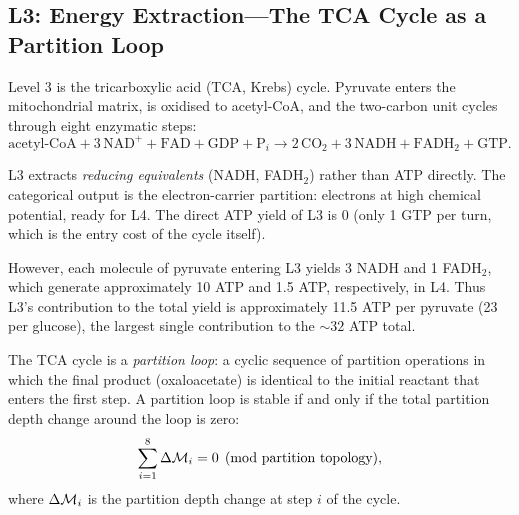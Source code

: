 \subsection{L3: Energy Extraction---The TCA Cycle as a Partition Loop}
\label{ssec:L3}

Level 3 is the tricarboxylic acid (TCA, Krebs) cycle. Pyruvate enters the
mitochondrial matrix, is oxidised to acetyl-CoA, and the two-carbon unit
cycles through eight enzymatic steps:
\begin{equation}
  \text{acetyl-CoA} + 3\,\mathrm{NAD}^+ + \mathrm{FAD} + \mathrm{GDP} + \mathrm{P}_i
    \to 2\,\mathrm{CO}_2 + 3\,\mathrm{NADH} + \mathrm{FADH}_2 + \mathrm{GTP}.
  \label{eq:tca}
\end{equation}

L3 extracts \emph{reducing equivalents} (NADH, FADH$_2$) rather than ATP
directly. The categorical output is the electron-carrier partition: electrons
at high chemical potential, ready for L4. The direct ATP yield of L3 is 0
(only 1 GTP per turn, which is the entry cost of the cycle itself).

However, each molecule of pyruvate entering L3 yields 3 NADH and 1 FADH$_2$,
which generate approximately 10 ATP and 1.5 ATP, respectively, in L4.
Thus L3's contribution to the total yield is approximately 11.5 ATP per
pyruvate (23 per glucose), the largest single contribution to the $\sim 32$
ATP total.

\begin{theorem}
\label{thm:partition_loop}
The TCA cycle is a \emph{partition loop}: a cyclic sequence of partition
operations in which the final product (oxaloacetate) is identical to the
initial reactant that enters the first step. A partition loop is stable if
and only if the total partition depth change around the loop is zero:
\begin{equation}
  \sum_{i=1}^{8} \Delta\mathcal{M}_i = 0 \pmod{\text{partition topology}},
  \label{eq:partition_loop_condition}
\end{equation}
where $\Delta\mathcal{M}_i$ is the partition depth change at step $i$ of the cycle.
\end{theorem}

